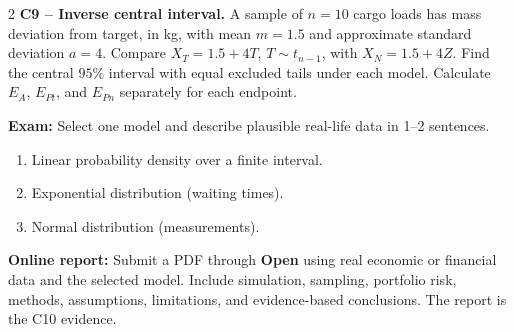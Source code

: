 \begin{multicols}{2}
\textbf{C9 -- Inverse central interval.} A sample of $n=10$ cargo loads has mass deviation from target, in kg, with mean $m=1.5$ and approximate standard deviation $a=4$. Compare $X_T=1.5+4T$, $T\sim t_{n-1}$, with $X_N=1.5+4Z$.
Find the central $95\%$ interval with equal excluded tails under each model. Calculate $E_A$, $E_{Pt}$, and $E_{Pn}$ separately for each endpoint. 


\textbf{Exam:} Select one model and describe plausible real-life data in 1--2 sentences. 
\begin{enumerate}[label=\textbf{(\alph*)},leftmargin=*]
	\item Linear probability density over a finite interval.
	\item Exponential distribution (waiting times).
	\item Normal distribution (measurements).
\end{enumerate}

\textbf{Online report:} Submit a PDF through \textbf{Open} using real economic or financial data and the selected model. Include simulation, sampling, portfolio risk, methods, assumptions, limitations, and evidence-based conclusions. The report is the C10 evidence.

\end{multicols}

